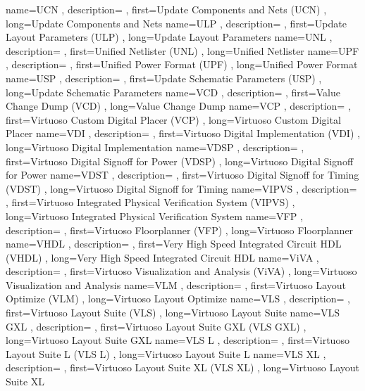 { name={UCN}
, description={}
, first={Update Components and Nets (UCN)}
, long={Update Components and Nets}
}
{ name={ULP}
, description={}
, first={Update Layout Parameters (ULP)}
, long={Update Layout Parameters}
}
{ name={UNL}
, description={}
, first={Unified Netlister (UNL)}
, long={Unified Netlister}
}
{ name={UPF}
, description={}
, first={Unified Power Format (UPF)}
, long={Unified Power Format}
}
{ name={USP}
, description={}
, first={Update Schematic Parameters (USP)}
, long={Update Schematic Parameters}
}
{ name={VCD}
, description={}
, first={Value Change Dump (VCD)}
, long={Value Change Dump}
}
{ name={VCP}
, description={}
, first={Virtuoso Custom Digital Placer (VCP)}
, long={Virtuoso Custom Digital Placer}
}
{ name={VDI}
, description={}
, first={Virtuoso Digital Implementation (VDI)}
, long={Virtuoso Digital Implementation}
}
{ name={VDSP}
, description={}
, first={Virtuoso Digital Signoff for Power (VDSP)}
, long={Virtuoso Digital Signoff for Power}
}
{ name={VDST}
, description={}
, first={Virtuoso Digital Signoff for Timing (VDST)}
, long={Virtuoso Digital Signoff for Timing}
}
{ name={VIPVS}
, description={}
, first={Virtuoso Integrated Physical Verification System (VIPVS)}
, long={Virtuoso Integrated Physical Verification System}
}
{ name={VFP}
, description={}
, first={Virtuoso Floorplanner (VFP)}
, long={Virtuoso Floorplanner}
}
{ name={VHDL}
, description={}
, first={Very High Speed Integrated Circuit HDL (VHDL)}
, long={Very High Speed Integrated Circuit HDL}
}
{ name={ViVA}
, description={}
, first={Virtuoso Visualization and Analysis (ViVA)}
, long={Virtuoso Visualization and Analysis}
}
{ name={VLM}
, description={}
, first={Virtuoso Layout Optimize (VLM)}
, long={Virtuoso Layout Optimize}
}
{ name={VLS}
, description={}
, first={Virtuoso Layout Suite (VLS)}
, long={Virtuoso Layout Suite}
}
{ name={VLS GXL}
, description={}
, first={Virtuoso Layout Suite GXL (VLS GXL)}
, long={Virtuoso Layout Suite GXL}
}
{ name={VLS L}
, description={}
, first={Virtuoso Layout Suite L (VLS L)}
, long={Virtuoso Layout Suite L}
}
{ name={VLS XL}
, description={}
, first={Virtuoso Layout Suite XL (VLS XL)}
, long={Virtuoso Layout Suite XL}
}
